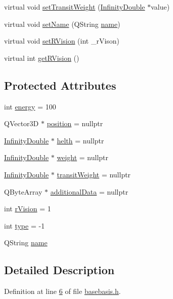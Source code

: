 \begin{DoxyCompactItemize}
\item 
virtual void \hyperlink{a00137_ac480b8140b5b290f49b4b96a47291180}{set\+Transit\+Weight} (\hyperlink{a00161}{Infinity\+Double} $\ast$value)
\item 
virtual void \hyperlink{a00137_a874f246d3249a989750e3db85ea4bfcd}{set\+Name} (Q\+String \hyperlink{a00137_af35fba4ed599605c3d78b3c3a71fa467}{name})
\item 
virtual void \hyperlink{a00137_a2719e14051c30f39ca60f4998e48abf9}{set\+R\+Vision} (int \+\_\+r\+Vison)
\item 
virtual int \hyperlink{a00137_a4437ee7dcdb6e3e3c58c8b00d8bb0500}{get\+R\+Vision} ()
\end{DoxyCompactItemize}
\subsection*{Protected Attributes}
\begin{DoxyCompactItemize}
\item 
int \hyperlink{a00149_a59708d348b0218ba9f91c02361524963}{energy} = 100
\item 
Q\+Vector3D $\ast$ \hyperlink{a00137_afe080b1942ec40832e94cb884ec87456}{position} = nullptr
\item 
\hyperlink{a00161}{Infinity\+Double} $\ast$ \hyperlink{a00137_a440cf9e7d61c33482ab256a6e944b34d}{helth} = nullptr
\item 
\hyperlink{a00161}{Infinity\+Double} $\ast$ \hyperlink{a00137_a99901016531fd27b9b197dc88d3bfa4a}{weight} = nullptr
\item 
\hyperlink{a00161}{Infinity\+Double} $\ast$ \hyperlink{a00137_a865c937433f7d46665ca17e5adccd9df}{transit\+Weight} = nullptr
\item 
Q\+Byte\+Array $\ast$ \hyperlink{a00137_a4d3547697d3bd0c2d65c83b07b3f8f91}{additional\+Data} = nullptr
\item 
int \hyperlink{a00137_ae0ad3c240950eba352aeb04e6a9296b4}{r\+Vision} = 1
\item 
int \hyperlink{a00137_a73a4ca23072b617f3d17004e3c671bca}{type} = -\/1
\item 
Q\+String \hyperlink{a00137_af35fba4ed599605c3d78b3c3a71fa467}{name}
\end{DoxyCompactItemize}


\subsection{Detailed Description}


Definition at line \hyperlink{a00029_source_l00006}{6} of file \hyperlink{a00029_source}{basebasis.\+h}.



